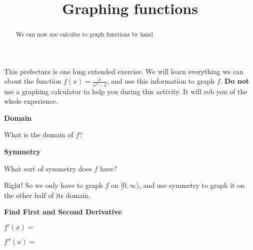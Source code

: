 \documentclass{ximera}
\title{Graphing functions}
\begin{document}
\begin{abstract}
  We can now use calculus to graph functions by hand
\end{abstract}

\maketitle




This prefecture is one long extended exercise.  We will learn everything we can about the function $f(x) = \frac{x}{x^2-1}$, and use this information to graph $f$.
\textbf{Do not} use a graphing calculator to help you during this activity.  It will rob you of the whole experience.

\begin{question}

\textbf{Domain}

\begin{solution}
What is the domain of $f$?
 
    \begin{multipleChoice}
    \end{multipleChoice}
    
\end{solution}    

\textbf{Symmetry}

\begin{solution}
   What sort of symmetry does $f$ have?
   
    \begin{multipleChoice}
    \end{multipleChoice}

\end{solution}    

    Right!  So we only have to graph $f$ on $[0,\infty)$, and use symmetry to graph it on the other half of its domain.
    
 \textbf{Find First and Second Derivative}
 
 \begin{solution}
 	$f'(x)=$
 \end{solution}
 
 \begin{solution}
 	$f''(x)=$
 \end{solution}
 

\end{question}
\end{document}
